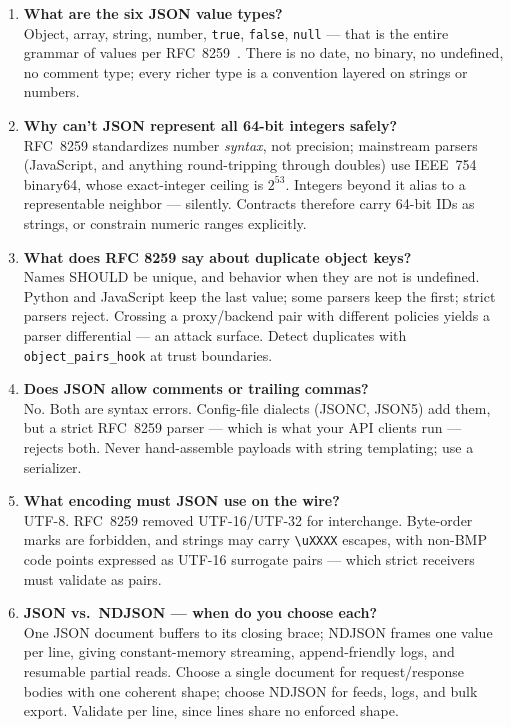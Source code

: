 \begin{enumerate}[label=\textbf{Q\arabic*.}, leftmargin=1.3cm, itemsep=0.8em]

\item \textbf{What are the six JSON value types?}\\
Object, array, string, number, \texttt{true}, \texttt{false}, \texttt{null} ---
that is the entire grammar of values per RFC~8259~\cite{rfc8259}. There is no date,
no binary, no undefined, no comment type; every richer type is a convention layered
on strings or numbers.

\item \textbf{Why can't JSON represent all 64-bit integers safely?}\\
RFC~8259 standardizes number \emph{syntax}, not precision; mainstream parsers
(JavaScript, and anything round-tripping through doubles) use IEEE~754 binary64,
whose exact-integer ceiling is $2^{53}$. Integers beyond it alias to a
representable neighbor --- silently. Contracts therefore carry 64-bit IDs as
strings, or constrain numeric ranges explicitly.

\item \textbf{What does RFC 8259 say about duplicate object keys?}\\
Names SHOULD be unique, and behavior when they are not is undefined. Python and
JavaScript keep the last value; some parsers keep the first; strict parsers reject.
Crossing a proxy/backend pair with different policies yields a parser differential
--- an attack surface. Detect duplicates with \texttt{object\_pairs\_hook} at trust
boundaries.

\item \textbf{Does JSON allow comments or trailing commas?}\\
No. Both are syntax errors. Config-file dialects (JSONC, JSON5) add them, but a
strict RFC~8259 parser --- which is what your API clients run --- rejects both.
Never hand-assemble payloads with string templating; use a serializer.

\item \textbf{What encoding must JSON use on the wire?}\\
UTF-8. RFC~8259 removed UTF-16/UTF-32 for interchange. Byte-order marks are
forbidden, and strings may carry \texttt{\textbackslash uXXXX} escapes, with
non-BMP code points expressed as UTF-16 surrogate pairs --- which strict receivers
must validate as pairs.

\item \textbf{JSON vs.\ NDJSON --- when do you choose each?}\\
One JSON document buffers to its closing brace; NDJSON frames one value per line,
giving constant-memory streaming, append-friendly logs, and resumable partial
reads. Choose a single document for request/response bodies with one coherent
shape; choose NDJSON for feeds, logs, and bulk export. Validate per line, since
lines share no enforced shape.


\end{enumerate}
